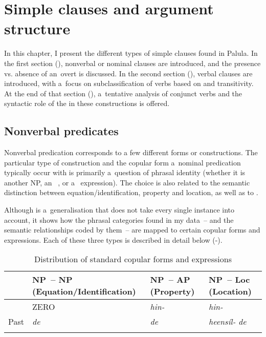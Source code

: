 \chapter{Simple clauses and argument structure}
\label{chap:12}

In this chapter, I present the different types of simple clauses found in Palula. In the first section (), nonverbal or nominal clauses are introduced, and the presence vs. absence of an~overt  is discussed. In the second section (), verbal clauses are introduced, with a~focus on subclassification of verbs based on  and transitivity. At the end of that section (), a~tentative analysis of conjunct verbs and the syntactic role of the  in these constructions is offered. 


\section{Nonverbal predicates}
\label{sec:12-1}

Nonverbal predication corresponds to a few different forms or constructions. The particular type of construction and the copular form a~nominal predication typically occur with is primarily a~question of phrasal identity (whether it is another NP, an~ , or a~ expression). The choice is also related to the semantic distinction between equation/identification, property and location, as well as to .


Although  is a~generalisation that does not take every single instance into account, it shows how the phrasal categories found in my data~-- and the semantic relationships coded by them~-- are mapped to certain copular forms and expressions. Each of these three types is described in detail below (-).


\begin{table}[b]
\caption{Distribution of standard copular forms and expressions}
\begin{tabularx}{\textwidth}{ l Q Q Q }
\lsptoprule
&
NP~-- NP
(Equation/{\allowbreak}Identification) &
NP~-- AP
(Property) &
NP~-- Loc
(Location)\\\midrule
{} &
ZERO &
\textit{hin-} &
\textit{hin-}\\
Past &
\textit{de} &
\textit{de} &
\textit{heensíl- de}\\\lspbottomrule
\end{tabularx}
\label{tab:12-1}
\end{table}

